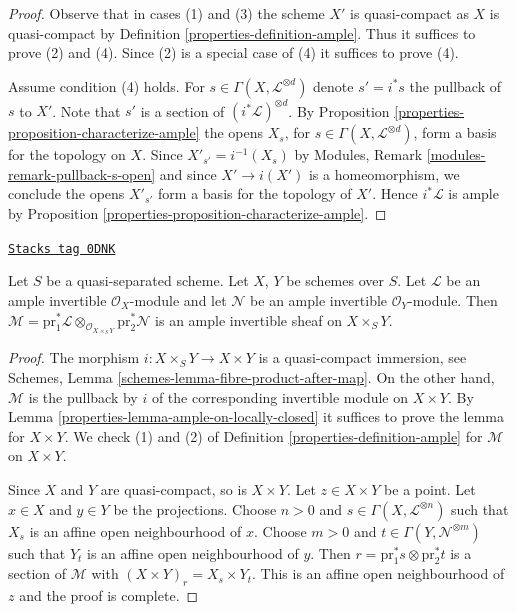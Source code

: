 \begin{proof}

Observe that in cases (1) and (3) the scheme $X'$ is quasi-compact
as $X$ is quasi-compact by Definition \ref{properties-definition-ample}.
Thus it suffices to prove (2) and (4). Since (2) is a special case
of (4) it suffices to prove (4).

\medskip\noindent
Assume condition (4) holds. For $s \in \Gamma(X, \mathcal{L}^{\otimes d})$
denote $s' = i^*s$ the pullback of $s$ to $X'$. Note that
$s'$ is a section of $(i^*\mathcal{L})^{\otimes d}$. By
Proposition \ref{properties-proposition-characterize-ample}
the opens $X_s$, for $s \in \Gamma(X, \mathcal{L}^{\otimes d})$,
form a basis for the topology on $X$. Since $X'_{s'} = i^{-1}(X_s)$ by
Modules, Remark \ref{modules-remark-pullback-s-open}
and since $X' \to i(X')$ is a homeomorphism, we conclude
the opens $X'_{s'}$ form a basis for the topology of $X'$. Hence
$i^*\mathcal{L}$ is ample by
Proposition \ref{properties-proposition-characterize-ample}.
\end{proof}

\begin{lemma}
\label{properties-lemma-ample-on-product}
\href{https://stacks.math.columbia.edu/tag/0DNK}{\texttt{Stacks tag 0DNK}}

Let $S$ be a quasi-separated scheme. Let $X$, $Y$ be schemes over $S$.
Let $\mathcal{L}$ be an ample invertible $\mathcal{O}_X$-module
and let $\mathcal{N}$ be an ample invertible $\mathcal{O}_Y$-module.
Then $\mathcal{M} = \text{pr}_1^*\mathcal{L}
\otimes_{\mathcal{O}_{X \times_S Y}} \text{pr}_2^*\mathcal{N}$
is an ample invertible sheaf on $X \times_S Y$.
\end{lemma}

\begin{proof}

The morphism $i : X \times_S Y \to X \times Y$ is a quasi-compact
immersion, see Schemes, Lemma \ref{schemes-lemma-fibre-product-after-map}.
On the other hand, $\mathcal{M}$ is the pullback by
$i$ of the corresponding invertible module on $X \times Y$.
By Lemma \ref{properties-lemma-ample-on-locally-closed} it suffices to prove the
lemma for $X \times Y$. We check (1) and (2) of
Definition \ref{properties-definition-ample} for $\mathcal{M}$ on $X \times Y$.

\medskip\noindent
Since $X$ and $Y$ are quasi-compact, so is $X \times Y$.
Let $z \in X \times Y$ be a point. Let $x \in X$ and $y \in Y$
be the projections. Choose $n > 0$ and
$s \in \Gamma(X, \mathcal{L}^{\otimes n})$
such that $X_s$ is an affine open neighbourhood of $x$.
Choose $m > 0$ and
$t \in \Gamma(Y, \mathcal{N}^{\otimes m})$
such that $Y_t$ is an affine open neighbourhood of $y$.
Then $r = \text{pr}_1^*s \otimes \text{pr}_2^*t$ is a section
of $\mathcal{M}$ with $(X \times Y)_r = X_s \times Y_t$.
This is an affine open neighbourhood of $z$ and the proof is complete.
\end{proof}


